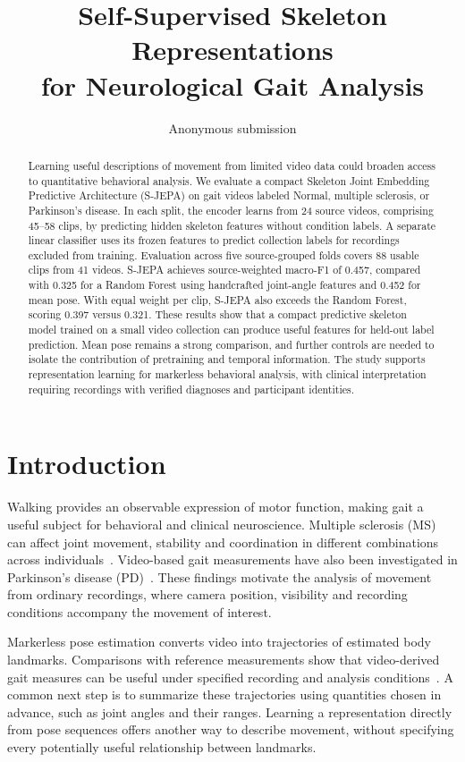 \documentclass[10pt,twocolumn,letterpaper]{article}
\title{Self-Supervised Skeleton Representations\\for Neurological Gait Analysis}
\author{Anonymous submission}
\begin{document}
\maketitle
\begin{abstract}
Learning useful descriptions of movement from limited video data could broaden access to quantitative behavioral analysis. We evaluate a compact Skeleton Joint Embedding Predictive Architecture (S-JEPA) on gait videos labeled Normal, multiple sclerosis, or Parkinson's disease. In each split, the encoder learns from 24 source videos, comprising 45--58 clips, by predicting hidden skeleton features without condition labels. A separate linear classifier uses its frozen features to predict collection labels for recordings excluded from training. Evaluation across five source-grouped folds covers 88 usable clips from 41 videos. S-JEPA achieves source-weighted macro-F1 of 0.457, compared with 0.325 for a Random Forest using handcrafted joint-angle features and 0.452 for mean pose. With equal weight per clip, S-JEPA also exceeds the Random Forest, scoring 0.397 versus 0.321. These results show that a compact predictive skeleton model trained on a small video collection can produce useful features for held-out label prediction. Mean pose remains a strong comparison, and further controls are needed to isolate the contribution of pretraining and temporal information. The study supports representation learning for markerless behavioral analysis, with clinical interpretation requiring recordings with verified diagnoses and participant identities.
\end{abstract}


\section{Introduction}
Walking provides an observable expression of motor function, making gait a useful subject for behavioral and clinical neuroscience. Multiple sclerosis (MS) can affect joint movement, stability and coordination in different combinations across individuals~\cite{filli2018,plotnik2020}. Video-based gait measurements have also been investigated in Parkinson's disease (PD)~\cite{shin2021}. These findings motivate the analysis of movement from ordinary recordings, where camera position, visibility and recording conditions accompany the movement of interest.

Markerless pose estimation converts video into trajectories of estimated body landmarks. Comparisons with reference measurements show that video-derived gait measures can be useful under specified recording and analysis conditions~\cite{stenum2021,stenum2024}. A common next step is to summarize these trajectories using quantities chosen in advance, such as joint angles and their ranges. Learning a representation directly from pose sequences offers another way to describe movement, without specifying every potentially useful relationship between landmarks.
\end{document}
